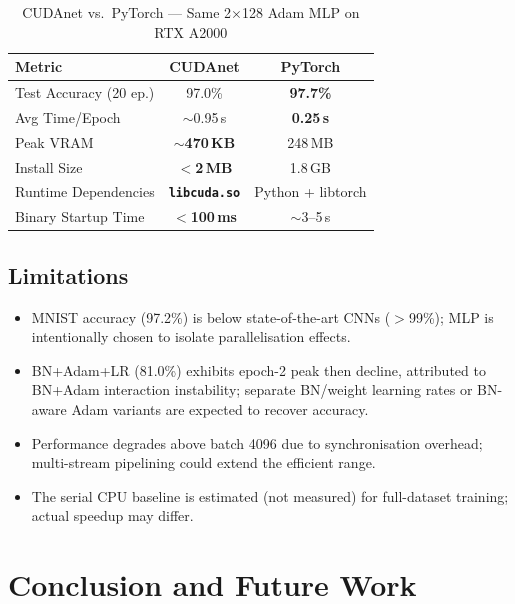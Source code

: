 \documentclass[conference]{IEEEtran}
\begin{document}
\begin{table}[htbp]
\caption{CUDAnet vs.\ PyTorch — Same 2$\times$128 Adam MLP on RTX A2000}
\begin{center}
\begin{tabular}{lcc}
\toprule
\textbf{Metric} & \textbf{CUDAnet} & \textbf{PyTorch}\\
\midrule
Test Accuracy (20 ep.)    & 97.0\%          & \textbf{97.7\%} \\
Avg Time/Epoch            & $\sim$0.95\,s   & \textbf{0.25\,s} \\
Peak VRAM                 & \textbf{$\sim$470\,KB} & 248\,MB \\
Install Size              & \textbf{$<$2\,MB}     & 1.8\,GB \\
Runtime Dependencies      & \textbf{\texttt{libcuda.so}} & Python + libtorch \\
Binary Startup Time       & \textbf{$<$100\,ms}   & $\sim$3--5\,s \\
\bottomrule
\end{tabular}
\label{tab:pytorch}
\end{center}
\end{table}

\subsection{Limitations}

\begin{itemize}
  \item MNIST accuracy (97.2\%) is below state-of-the-art CNNs ($>$99\%); MLP is intentionally chosen to isolate parallelisation effects.
  \item BN+Adam+LR (81.0\%) exhibits epoch-2 peak then decline, attributed to BN+Adam interaction instability; separate BN/weight learning rates or BN-aware Adam variants are expected to recover accuracy.
  \item Performance degrades above batch 4096 due to synchronisation overhead; multi-stream pipelining could extend the efficient range.
  \item The serial CPU baseline is estimated (not measured) for full-dataset training; actual speedup may differ.
\end{itemize}

\section{Conclusion and Future Work}
\end{document}
